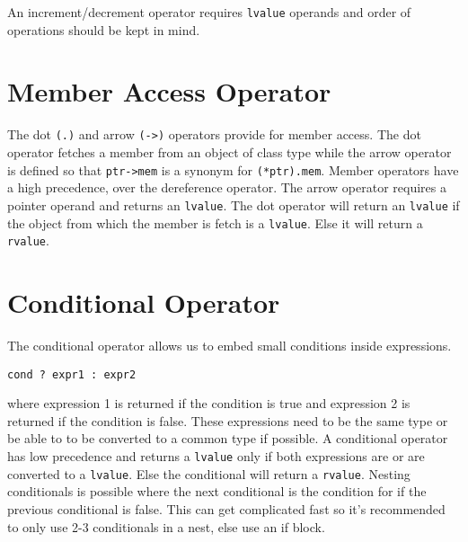 \documentclass[12pt, a4paper]{report}
\begin{document}
An increment/decrement operator requires \verb|lvalue| operands and order of operations should be kept in mind.
\section{Member Access Operator}
The dot \verb|(.)| and arrow \verb|(->)| operators provide for member access.
The dot operator fetches a member from an object of class type while the arrow operator is defined so that \verb|ptr->mem| is a synonym for \verb|(*ptr).mem|.
Member operators have a high precedence, over the dereference operator.
The arrow operator requires a pointer operand and returns an \verb|lvalue|.
The dot operator will return an \verb|lvalue| if the object from which the member is fetch is a \verb|lvalue|.
Else it will return a \verb|rvalue|.
\section{Conditional Operator}
The conditional operator allows us to embed small conditions inside expressions.

\verb|cond ? expr1 : expr2|

where expression 1 is returned if the condition is true and expression 2 is returned if the condition is false.
These expressions need to be the same type or be able to to be converted to a common type if possible.
A conditional operator has low precedence and returns a \verb|lvalue| only if both expressions are or are converted to a \verb|lvalue|.
Else the conditional will return a \verb|rvalue|.
Nesting conditionals is possible where the next conditional is the condition for if the previous conditional is false.
This can get complicated fast so it's recommended to only use 2-3 conditionals in a nest, else use an if block.
\end{document}
